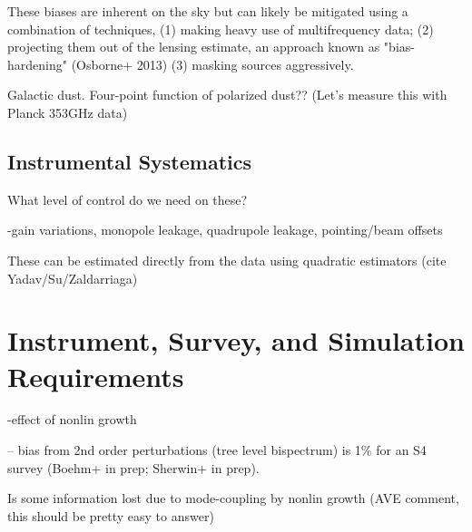 These biases are inherent on the sky but can likely be mitigated using a combination of techniques, (1) making heavy use of multifrequency data; (2) projecting them out of the lensing estimate, an approach known as "bias-hardening" (Osborne+ 2013) (3) masking sources aggressively.

Galactic dust.  Four-point function of polarized dust??  (Let's measure this with Planck 353GHz data)

\subsection{Instrumental Systematics}
 	


What level of control do we need on these?

-gain variations, monopole leakage, quadrupole leakage, pointing/beam offsets

These can be estimated directly from the data using quadratic estimators (cite Yadav/Su/Zaldarriaga)


\section{Instrument, Survey, and Simulation Requirements}\label{require}

-effect of nonlin growth

 -- bias from 2nd order perturbations (tree level bispectrum) is 1\% for an S4 survey (Boehm+ in prep; Sherwin+ in prep).  

Is some information lost due to mode-coupling by nonlin growth (AVE comment, this should be pretty easy to answer)





%

%


